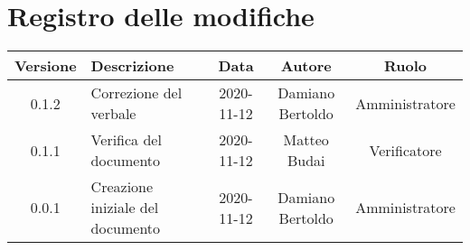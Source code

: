 \section*{Registro delle modifiche}

\begin{center}
	\begin{longtable}{|c|p{5cm}|c|c|c|}
	\hline
	\rowcolor{lighter-grayer}
	\textbf{Versione} & \textbf{Descrizione} & \textbf{Data} & \textbf{Autore} & \textbf{Ruolo} \\
	\hline
	\endfirsthead


	\hline
	0.1.2 & Correzione del verbale & 2020-11-12 & Damiano Bertoldo & Amministratore \\
	\hline
	0.1.1 & Verifica del documento & 2020-11-12 & Matteo Budai & Verificatore \\
	\hline
	0.0.1 & Creazione iniziale del documento & 2020-11-12 & Damiano Bertoldo & Amministratore \\
	\hline
	\end{longtable}
\end{center}